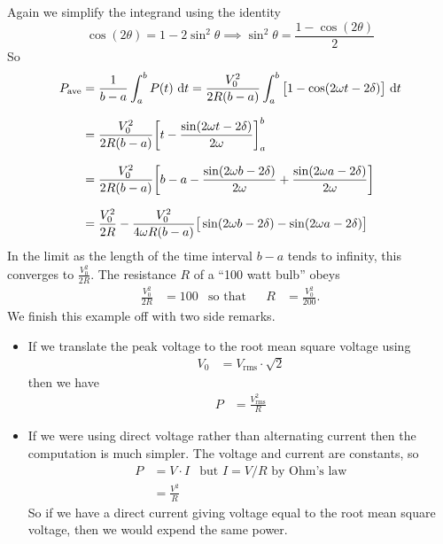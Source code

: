 \begin{eg}
Again we simplify the integrand using the identity
\begin{equation*}
\cos(2\theta) =1-2\sin^2\theta
\implies \sin^2\theta=\frac{1-\cos(2\theta)}{2}
\end{equation*}
So
\begin{align*}
P_\ave &= \frac{1}{b-a}\int_a^b P(t)\ \dee{t}
  = \frac{V_0^2}{2R(b-a)}\int_a^b \big[1-\cos(2\omega t-2\delta)\big]\ \dee{t} \\[0.1in]
&=\frac{V_0^2}{2R(b-a)}\bigg[t-\frac{\sin(2\omega t-2\delta)}{2\omega}\bigg]_a^b \\[0.1in]
&=\frac{V_0^2}{2R(b-a)}\bigg[b-a-\frac{\sin(2\omega b-2\delta)}{2\omega}
  +\frac{\sin(2\omega a-2\delta)}{2\omega}\bigg]\\[0.1in]
&=\frac{V_0^2}{2R}
   -\frac{V_0^2}{4\omega R(b-a)}\big[\sin(2\omega b-2\delta)-\sin(2\omega a-2\delta)\big]
\end{align*}
In the limit as the length of the time interval $b-a$ tends to infinity,
this converges to $\frac{V_0^2}{2R}$. The resistance $R$ of a
``100 watt bulb''  obeys
\begin{align*}
\frac{V_0^2}{2R} &=100 & \text{so that} &&
R &= \frac{V_0^2}{200}.
\end{align*}
We finish this example off with two side remarks.
\begin{itemize}
  \item
  If we translate the peak voltage to the root mean square voltage using
\begin{align*}
  V_0 &= V_\mathrm{rms} \cdot \sqrt{2}
\end{align*}
then we have
\begin{align*}
  P &= \frac{V^2_{\mathrm{rms}}}{R}
\end{align*}
  \item If we were using direct voltage rather than alternating current then the
computation is
much simpler. The voltage and current are constants, so
\begin{align*}
  P &= V \cdot I & \text{but $I = V/R$ by Ohm's law} \\
  &= \frac{V^2}{R}
\end{align*}
So if we have a direct current giving voltage equal to the root mean square voltage, then
we would expend the same power.
\end{itemize}

\end{eg}

